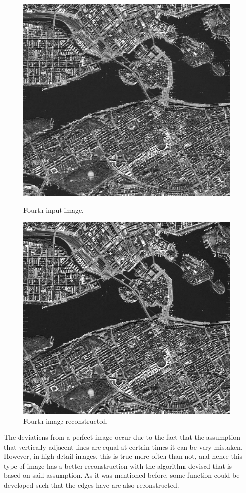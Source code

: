 \documentclass[a4paper,12pt]{article}
\begin{document}
\begin{figure}[h]
\centering
\begin{minipage}{.5\textwidth}
  \centering
  \includegraphics[width=0.8\linewidth]{img/desync4}
  \caption{Fourth input image.}
  \label{fig.12}
\end{minipage}%
\begin{minipage}{.5\textwidth}
  \centering
  \includegraphics[width=0.8\linewidth]{img/sync4}
  \caption{Fourth image reconstructed.}
  \label{fig.13}
\end{minipage}
\end{figure}

The deviations from a perfect image occur due to the fact that the assumption that vertically adjacent lines are equal at certain times it can be very mistaken. However, in high detail images, this is true more often than not, and hence this type of image has a better reconstruction with the algorithm devised that is based on said assumption. As it was mentioned before, some function could be developed such that the edges have are also reconstructed. 
\end{document}
